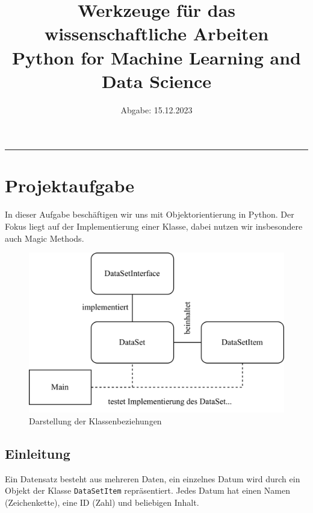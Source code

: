 \documentclass[12pt]{article}
\begin{document}
\title{\textbf{Werkzeuge für das wissenschaftliche Arbeiten}\\\large Python for Machine Learning and Data Science}

\date{\vspace{-1cm}\hfill Abgabe: 15.12.2023}
\maketitle

\vspace{-1cm}
\hrule

\tableofcontents


\section{Projektaufgabe}
In dieser Aufgabe beschäftigen wir uns mit Objektorientierung in Python. Der Fokus liegt auf der Implementierung einer Klasse, dabei nutzen wir insbesondere auch Magic Methods.

\renewcommand{\figurename}{Abbildung}
\begin{figure}[h!]
    \centering
    \includegraphics[scale=0.9]{./../diagram/new_diagram.png}
    \caption{Darstellung der Klassenbeziehungen}
\end{figure}

\subsection{Einleitung}
Ein Datensatz besteht aus mehreren Daten, ein einzelnes Datum wird durch ein Objekt der Klasse \texttt{DataSetItem} repräsentiert. Jedes Datum hat einen Namen (Zeichenkette), eine ID (Zahl) und beliebigen Inhalt.
\end{document}
